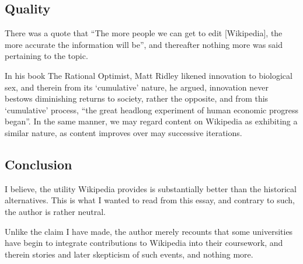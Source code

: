 \subsection{Quality}

There was a quote that ``The more people we can get to edit [Wikipedia], the more accurate the information will be'', and thereafter nothing more was said pertaining to the topic.

In his book The Rational Optimist, Matt Ridley likened innovation to biological sex, and therein from its `cumulative' nature, he argued, innovation never bestows diminishing returns to society, rather the opposite, and from this `cumulative' process, ``the great headlong experiment of human economic progress began''. In the same manner, we may regard content on Wikipedia as exhibiting a similar nature, as content improves over may successive iterations. 

\subsection{Conclusion}

I believe, the utility Wikipedia provides is substantially better than the historical alternatives. This is what I wanted to read from this essay, and contrary to such, the author is rather neutral.

Unlike the claim I have made, the author merely recounts that some universities have begin to integrate contributions to Wikipedia into their coursework, and therein stories and later skepticism of such events, and nothing more.


